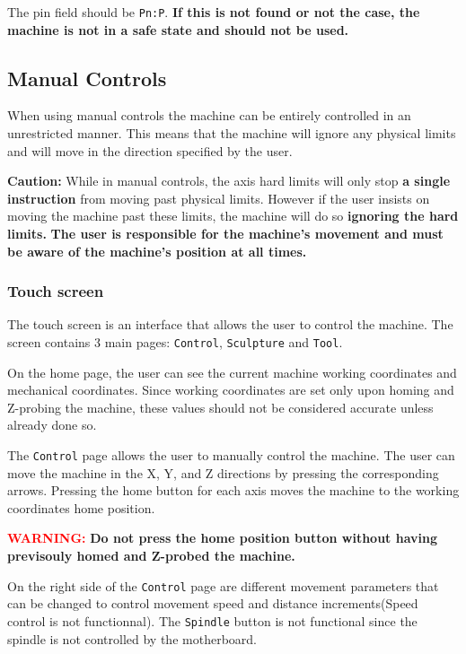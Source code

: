 \documentclass[11pt, openright]{book}
\begin{document}
        
        The pin field  should be \texttt{Pn:P}. \textbf{If this is not found or not the case, the machine is not in a safe state and should not be used.}
        
    \subsection{Manual Controls}

        When using manual controls the machine can be entirely controlled in an unrestricted manner. This means that the machine will ignore any physical limits and will move in the direction specified by the user. 

         \begin{dent}{\textbf{Caution:}}
            While in manual controls, the axis hard limits will only stop \textbf{a single instruction} from moving past physical limits. However if the user insists on moving the machine past these limits, the machine will do so \textbf{ignoring the hard limits.}
            \textbf{The user is responsible for the machine's movement and must be aware of the machine's position at all times.}
        \end{dent}

        \subsubsection{Touch screen}

        The touch screen is an interface that allows the user to control the machine. The screen contains 3 main pages: \texttt{Control}, \texttt{Sculpture} and \texttt{Tool}. 

        On the home page, the user can see the current machine working coordinates and mechanical coordinates. Since working coordinates are set only upon homing and Z-probing the machine, these values should not be considered accurate unless already done so.
        
        The \texttt{Control} page allows the user to manually control the machine. The user can move the machine in the X, Y, and Z directions by pressing the corresponding arrows. Pressing the home button for each axis moves the machine to the working coordinates home position. 
        \begin{dent}{\textcolor{red}{\textbf{WARNING:}}}
            \textbf{Do not press the home position button without having previsouly homed and Z-probed the machine.} 
        \end{dent}
        \vspace{5pt}
        On the right side of the \texttt{Control} page are different movement parameters that can be changed to control movement speed and distance increments(Speed control is not functionnal). The \texttt{Spindle} button is not functional since the spindle is not controlled by the motherboard.
        
\end{document}
